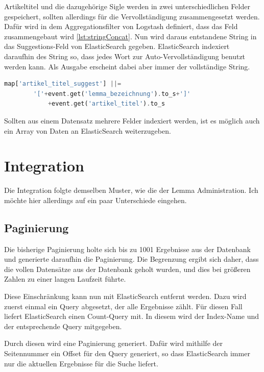 Artikeltitel und die dazugehörige Sigle werden in zwei unterschiedlichen Felder gespeichert, sollten allerdings für die Vervollständigung zusammengesetzt werden.
Dafür wird in dem Aggregationsfilter von Logstash definiert, dass das Feld zusammengebaut wird \ref{lst:stringConcat}. Nun wird daraus entstandene String in das Suggestions-Feld von ElasticSearch gegeben. ElasticSearch indexiert daraufhin des String so, dass jedes Wort zur Auto-Vervollständigung benutzt werden kann. Als Ausgabe erscheint dabei aber immer der vollständige String.

\begin{lstlisting}[language=PHP, frame=single, label={lst:stringConcat}] 
    map['artikel_titel_suggest'] ||= 
        '['+event.get('lemma_bezeichnung').to_s+']'
            +event.get('artikel_titel').to_s
\end{lstlisting}

Sollten aus einem Datensatz mehrere Felder indexiert werden, ist es möglich auch ein Array von Daten an ElasticSearch weiterzugeben.

\section{Integration}

Die Integration folgte demselben Muster, wie die der Lemma Administration. Ich möchte hier allerdings auf ein paar Unterschiede eingehen. 

\subsection{Paginierung}

Die bisherige Paginierung holte sich bis zu 1001 Ergebnisse aus der Datenbank und generierte daraufhin die Paginierung. Die Begrenzung ergibt sich daher, dass die vollen Datensätze aus der Datenbank geholt wurden, und dies bei größeren Zahlen zu einer langen Laufzeit führte.

Diese Einschränkung kann nun mit ElasticSearch entfernt werden. Dazu wird zuerst einmal ein Query abgesetzt, der alle Ergebnisse zählt. Für diesen Fall liefert ElasticSearch einen Count-Query mit. In diesem wird der Index-Name und der entsprechende Query mitgegeben. 

Durch diesen wird eine Paginierung generiert. Dafür wird mithilfe der Seitennummer ein Offset für den Query generiert, so dass ElasticSearch immer nur die aktuellen Ergebnisse für die Suche liefert.

